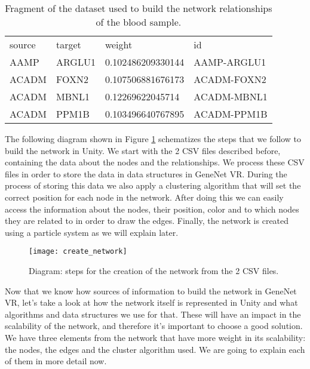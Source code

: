 \begin{table}[h!]
\centering
\begin{tabular}{llll}
\hline
source & target & weight            & id          \\
AAMP   & ARGLU1 & 0.102486209330144 & AAMP-ARGLU1 \\
ACADM  & FOXN2  & 0.107506881676173 & ACADM-FOXN2 \\
ACADM  & MBNL1  & 0.12269622045714  & ACADM-MBNL1 \\
ACADM  & PPM1B  & 0.103496640767895 & ACADM-PPM1B \\
\hline
\end{tabular}
\caption{Fragment of the dataset used to build the network relationships of the blood sample.}
\label{tab:network-data}
\end{table}

The following diagram shown in Figure \ref{fig:create_network} schematizes the steps that we follow to build the network in Unity. We start with the 2 CSV files described before, containing the data about the nodes and the relationships. We process these CSV files in order to store the data in data structures in GeneNet VR. During the process of storing this data we also apply a clustering algorithm that will set the correct position for each node in the network. After doing this we can easily access the information about the nodes, their position, color and to which nodes they are related to in order to draw the edges. Finally, the network is created using a particle system as we will explain later.

\begin{figure}[h!]
    \centering%
    \texttt{[image: create\_network]}
    \caption{Diagram: steps for the creation of the network from the 2 CSV files.}
    \label{fig:create_network}
\end{figure}%

Now that we know how sources of information to build the network in GeneNet VR, let's take a look at how the network itself is represented in Unity and what algorithms and data structures we use for that. These will have an impact in the scalability of the network, and therefore it's important to choose a good solution. We have three elements from the network that have more weight in its scalability: the nodes, the edges and the cluster algorithm used. We are going to explain each of them in more detail now.


